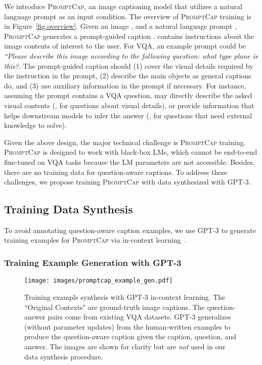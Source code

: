 \documentclass[10pt,twocolumn,letterpaper]{article}
\newcommand{\NAME}{\textsc{PromptCap}\xspace}
\begin{document}
We introduce \NAME, an image captioning model that utilizes a natural language prompt as an input condition.
The overview of \NAME training is in Figure~\ref{fig:overview}.
Given an image , and a natural language prompt , \NAME generates a prompt-guided caption .
 contains instructions about the image contents of interest to the user. 
For VQA, an example prompt could be \textit{``Please describe this image according to the following question: what type plane is this?}.
The prompt-guided caption  should (1) cover the visual details required by the instruction in the prompt, (2) describe the main objects as general captions do, and (3) use auxiliary information in the prompt if necessary.
For instance, assuming the prompt contains a VQA question,  may directly describe the asked visual contents (\eg, for questions about visual details), or provide information that helps downstream models to infer the answer (\eg, for questions that need external knowledge to solve). 

Given the above design, the major technical challenge is \NAME training. \NAME is designed to work with black-box LMs, which cannot be end-to-end fine-tuned on VQA tasks because the LM parameters are not accessible. Besides, there are no training data for question-aware captions. To address these challenges, we propose training \NAME with data synthesized with GPT-3. 


\subsection{Training Data Synthesis}
\label{sec:approach:example_gen}

To avoid annotating question-aware caption examples, we use GPT-3 to generate training examples for \NAME via in-context learning~\cite{brown2020language, rubin2022learning, hu-etal-2022-context, cheng2022binding}.

\vspace{-0.1in}
\subsubsection{Training Example Generation with GPT-3}

\begin{figure}[t]
\centering
  \texttt{[image: images/promptcap\_example\_gen.pdf]}
  \caption{
Training example synthesis with GPT-3 in-context learning.
The ``Original Contexts" are ground-truth image captions.
The question-answer pairs come from existing VQA datasets.
GPT-3 generalizes (without parameter updates) from the human-written examples to produce the question-aware caption given the caption, question, and answer.  The images are shown for clarity but are {\it not} used in our data synthesis procedure. 
}
  \vspace{-4mm}
  \label{fig:example_gen}
\end{figure}
\end{document}
